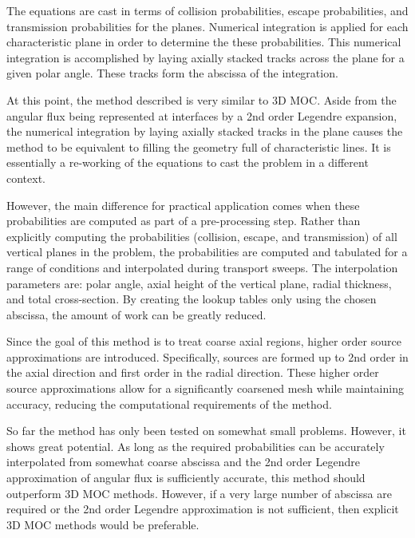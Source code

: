 The equations are cast in terms of collision probabilities, escape probabilities, and transmission probabilities for the planes. Numerical integration is applied for each characteristic plane in order to determine the these probabilities. This numerical integration is accomplished by laying axially stacked tracks across the plane for a given polar angle. These tracks form the abscissa of the integration. 

At this point, the method described is very similar to 3D \ac{MOC}. Aside from the angular flux being represented at interfaces by a 2nd order Legendre expansion, the numerical integration by laying axially stacked tracks in the plane causes the method to be equivalent to filling the geometry full of characteristic lines. It is essentially a re-working of the equations to cast the problem in a different context.

However, the main difference for practical application comes when these probabilities are computed as part of a pre-processing step. Rather than explicitly computing the probabilities (collision, escape, and transmission) of all vertical planes in the problem, the probabilities are computed and tabulated for a range of conditions and interpolated during transport sweeps. The interpolation parameters are: polar angle, axial height of the vertical plane, radial thickness, and total cross-section. By creating the lookup tables only using the chosen abscissa, the amount of work can be greatly reduced.

Since the goal of this method is to treat coarse axial regions, higher order source approximations are introduced. Specifically, sources are formed up to 2nd order in the axial direction and first order in the radial direction. These higher order source approximations allow for a significantly coarsened mesh while maintaining accuracy, reducing the computational requirements of the method.

So far the method has only been tested on somewhat small problems. However, it shows great potential. As long as the required probabilities can be accurately interpolated from somewhat coarse abscissa and the 2nd order Legendre approximation of angular flux is sufficiently accurate, this method should outperform 3D \ac{MOC} methods. However, if a very large number of abscissa are required or the 2nd order Legendre approximation is not sufficient, then explicit 3D \ac{MOC} methods would be preferable. 


